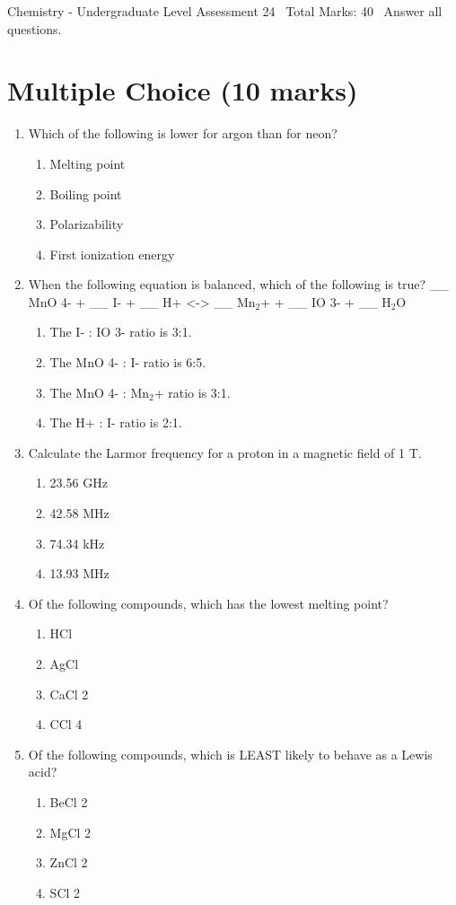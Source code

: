 \documentclass[12pt]{article}
\begin{document}
\begin{center}
Chemistry - Undergraduate Level Assessment 24 \
Total Marks: 40 \
Answer all questions.
\end{center}

\section*{Multiple Choice (10 marks)}
\begin{enumerate}[label=\arabic*.]
\item Which of the following is lower for argon than for neon?
\begin{enumerate}[label=(\alph*)]
    \item Melting point
    \item Boiling point
    \item Polarizability
    \item First ionization energy
\end{enumerate}
\item When the following equation is balanced, which of the following is true? \_\_ MnO 4- + \_\_ I- + \_\_ H+ \textless{}-\textgreater{} \_\_ Mn$_{2}$+ + \_\_ IO 3- + \_\_ H$_{2}$O
\begin{enumerate}[label=(\alph*)]
    \item The I- : IO 3- ratio is 3:1.
    \item The MnO 4- : I- ratio is 6:5.
    \item The MnO 4- : Mn$_{2}$+ ratio is 3:1.
    \item The H+ : I- ratio is 2:1.
\end{enumerate}
\item Calculate the Larmor frequency for a proton in a magnetic field of 1 T.
\begin{enumerate}[label=(\alph*)]
    \item 23.56 GHz
    \item 42.58 MHz
    \item 74.34 kHz
    \item 13.93 MHz
\end{enumerate}
\item Of the following compounds, which has the lowest melting point?
\begin{enumerate}[label=(\alph*)]
    \item HCl
    \item AgCl
    \item CaCl 2
    \item CCl 4
\end{enumerate}
\item Of the following compounds, which is LEAST likely to behave as a Lewis acid?
\begin{enumerate}[label=(\alph*)]
    \item BeCl 2
    \item MgCl 2
    \item ZnCl 2
    \item SCl 2
\end{enumerate}
\end{enumerate}
\end{document}
